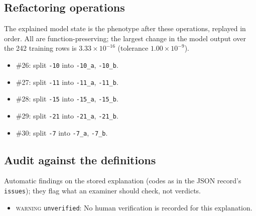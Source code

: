 \begin{drafted}
\subsection{Refactoring operations}\label{app:heart-s4-c1:operations}
The explained model state is the phenotype after these operations, replayed in order. All are function-preserving; the largest change in the model output over the 242 training rows is $3.33\times 10^{-16}$ (tolerance $1.00\times 10^{-9}$).
\begin{itemize}
\item \#26: split \texttt{-10} into \texttt{-10\_\allowbreak{}a}, \texttt{-10\_\allowbreak{}b}.
\item \#27: split \texttt{-11} into \texttt{-11\_\allowbreak{}a}, \texttt{-11\_\allowbreak{}b}.
\item \#28: split \texttt{-15} into \texttt{-15\_\allowbreak{}a}, \texttt{-15\_\allowbreak{}b}.
\item \#29: split \texttt{-21} into \texttt{-21\_\allowbreak{}a}, \texttt{-21\_\allowbreak{}b}.
\item \#30: split \texttt{-7} into \texttt{-7\_\allowbreak{}a}, \texttt{-7\_\allowbreak{}b}.
\end{itemize}
\subsection{Audit against the definitions}\label{app:heart-s4-c1:audit}
Automatic findings on the stored explanation (codes as in the JSON record's \texttt{issues}); they flag what an examiner should check, not verdicts.
\begin{itemize}
\item \textsc{warning} \texttt{unverified}: No human verification is recorded for this explanation.
\end{itemize}
\end{drafted}
